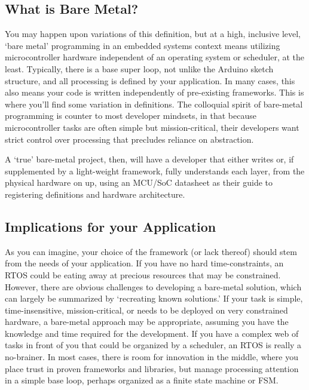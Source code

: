 \subsection{What is Bare Metal?}

You may happen upon variations of this definition, but at a high, inclusive level, ‘bare metal’ programming in an embedded systems context means utilizing microcontroller hardware independent of an operating system or scheduler, at the least. Typically, there is a base super loop, not unlike the Arduino sketch structure, and all processing is defined by your application. In many cases, this also means your code is written independently of pre-existing frameworks. This is where you’ll find some variation in definitions. The colloquial spirit of bare-metal programming is counter to most developer mindsets, in that because microcontroller tasks are often simple but mission-critical, their developers want strict control over processing that precludes reliance on abstraction.

A ‘true’ bare-metal project, then, will have a developer that either writes or, if supplemented by a light-weight framework, fully understands each layer, from the physical hardware on up, using an MCU/SoC datasheet as their guide to registering definitions and hardware architecture.

\subsection{Implications for your Application}

As you can imagine, your choice of the framework (or lack thereof) should stem from the needs of your application. If you have no hard time-constraints, an RTOS could be eating away at precious resources that may be constrained. However, there are obvious challenges to developing a bare-metal solution, which can largely be summarized by ‘recreating known solutions.’ If your task is simple, time-insensitive, mission-critical, or needs to be deployed on very constrained hardware, a bare-metal approach may be appropriate, assuming you have the knowledge and time required for the development. If you have a complex web of tasks in front of you that could be organized by a scheduler, an RTOS is really a no-brainer. In most cases, there is room for innovation in the middle, where you place trust in proven frameworks and libraries, but manage processing attention in a simple base loop, perhaps organized as a finite state machine or FSM.


